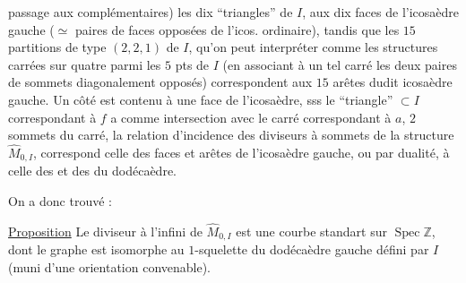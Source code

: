 passage aux complémentaires) les dix ``triangles'' de $I$,  aux dix faces de l'icosaèdre gauche ($\simeq$ paires de faces opposées de l'icos. ordinaire), tandis que les $15$ partitions de type $(2,2,1)$ de $I$, qu'on peut interpréter comme les structures carrées sur quatre parmi les $5$ pts de $I$
(en associant à un tel carré les deux paires de sommets diagonalement opposés) correspondent aux $15$ arêtes dudit icosaèdre gauche.
Un côté  est contenu  à une face  de l'icosaèdre, sss le ``triangle'' $\subset I$ correspondant à $f$ a comme intersection avec le carré correspondant à $a$,   $2$ sommets  du carré, 
 la relation d'incidence des diviseurs à sommets de la structure $\widehat M_{0,I}$, correspond  celle des faces et arêtes de l'icosaèdre gauche, ou par dualité, à celle des  et des  du dodécaèdre.

On a donc trouvé :

\uline{Proposition} Le diviseur à l'infini  de $\widehat M_{0,I}$ est une courbe standart  sur $\operatorname{Spec}\mathbb Z$, dont le graphe est isomorphe au  $1$-squelette du dodécaèdre gauche défini par $I$ (muni d'une orientation convenable).

